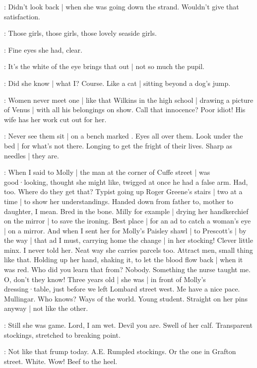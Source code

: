 \BloomCurrent:
Didn't look back |
when she was going down the strand.
Wouldn't give that satisfaction.

\BloomHist:
Those girls,
those girls,
those lovely seaside girls.

\BloomCurrent:
Fine eyes she had,
clear.

\BloomAbstract:
It's the white of the eye brings that out |
not so much the pupil.

\BloomCurrent:
Did she know |
what I?
Course.
Like a cat |
sitting beyond a dog's jump.

\BloomHist:
Women never meet one |
like that Wilkins in the high school |
drawing a picture of Venus |
with all his belongings on show.%
Call that innocence?
Poor idiot!
His wife has her work cut out for her.

\BloomAbstract:
Never see them sit |
on a bench marked .
Eyes all over them.
Look under the bed |
for what's not there.
Longing to get the fright of their lives.
Sharp as needles |
they are.

\BloomHist:
When I said to Molly |
the man at the corner of Cuffe street |
was good·looking,
thought she might like,
twigged at once
he had a false arm.
Had,
too.
Where do they get that?
Typist going up Roger Greene's stairs |
two at a time |
to show her understandings.
Handed down from father to,
mother to daughter,
I mean.
Bred in the bone.
Milly for example |
drying her handkerchief
on the mirror |
to save the ironing.
Best place |
for an ad to catch a woman's eye |
on a mirror.%
And when I sent her
for Molly's Paisley shawl |
to Prescott's |
by the way |
that ad I must,
carrying home the change |
in her stocking!
Clever little minx.
I never told her.
Neat way she carries parcels too.
Attract men,
small thing like that.
Holding up her hand,
shaking it,
to let the blood flow back |
when it was red.
Who did you learn that from?
Nobody.
Something the nurse taught me.
O,
don't they know!
Three years old |
she was |
in front of Molly's dressing·table,
just before we left Lombard street west.
Me have a nice pace.
Mullingar.
Who knows?
Ways of the world.
Young student.
Straight on her pins anyway |
not like the other.

\BloomCurrent:
Still she was game.
Lord,
I am wet.
Devil you are.
Swell of her calf.
Transparent stockings,
stretched to breaking point.%

\BloomCurrent:
Not like that frump today.
A.E.
Rumpled stockings.
Or the one in Grafton street.
White.
Wow!
Beef to the heel.

